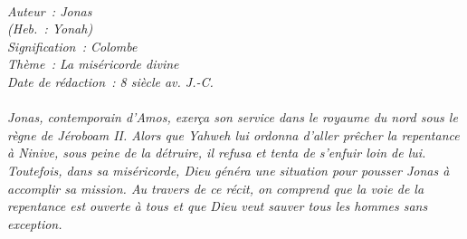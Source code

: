 \BFont
\noindent\hrulefill
{\footnotesize
\textit{
\bigskip
{\centering{}
\\Auteur~: Jonas
\\(Heb.~: Yonah)
\\Signification~: Colombe
\\Thème~: La miséricorde divine
\\Date de rédaction~: 8 siècle av. J.-C.\\}
}
\textit{
\\Jonas, contemporain d'Amos, exerça son service dans le royaume du nord sous le règne de Jéroboam II. Alors que Yahweh lui ordonna d'aller prêcher la repentance à Ninive, sous peine de la détruire, il refusa et tenta de s'enfuir loin de lui. Toutefois, dans sa miséricorde, Dieu généra une situation pour pousser Jonas à accomplir sa mission. Au travers de ce récit, on comprend que la voie de la repentance est ouverte à tous et que Dieu veut sauver tous les hommes sans exception.\bigskip
}
}
\par\nobreak\noindent\hrulefill
